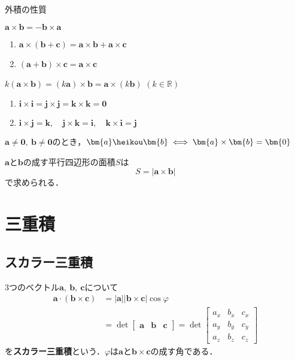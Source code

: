 \begin{kousiki}{外積の性質}
	\begin{enumerate}[label=\textbf{[\arabic*]}, labelsep=10pt, leftmargin=23pt]
		\item $\bm{a} \times \bm{b} = -\bm{b} \times \bm{a}$
		\item 
			\begin{enumerate}[label=(\roman*), labelsep=10pt, leftmargin=23pt]
				\item $\bm{a} \times (\bm{b} + \bm{c}) = \bm{a} \times \bm{b} + \bm{a} \times \bm{c}$
				\item $(\bm{a} + \bm{b}) \times \bm{c} = \bm{a} \times \bm{c}$
			\end{enumerate}
		\item $k(\bm{a} \times \bm{b}) = (k\bm{a}) \times \bm{b} = \bm{a} \times (k\bm{b})$ \qquad $(k \in \mathbb{R})$
		\item
			\begin{enumerate}[label=(\roman*), labelsep=10pt, leftmargin=23pt]
				\item $\bm{i} \times \bm{i} = \bm{j} \times \bm{j} = \bm{k} \times \bm{k} = \bm{0}$
				\item $\bm{i} \times \bm{j} = \bm{k},\quad \bm{j} \times \bm{k} = \bm{i},\quad \bm{k} \times \bm{i} = \bm{j}$
			\end{enumerate}
		\item $\bm{a} \ne \bm{0},\ \bm{b} \ne \bm{0}$のとき，$\bm{a} \heikou \bm{b} \iff \bm{a} \times \bm{b} = \bm{0}$
	\end{enumerate}
	
\end{kousiki}

$\bm{a}$と$\bm{b}$の成す平行四辺形の面積$S$は
\begin{equation}
	S = |\bm{a} \times \bm{b}|
\end{equation}
で求められる．



\section{三重積}
\subsection{スカラー三重積}

3つのベクトル$\bm{a},\ \bm{b},\ \bm{c}$について
\begin{align}
	\bm{a} \cdot (\bm{b} \times \bm{c}) &= |\bm{a}||\bm{b} \times \bm{c}|\cos\varphi \\
	&= \det
	\begin{bmatrix}
		\bm{a} & \bm{b} & \bm{c}
	\end{bmatrix}
	= \det
	\begin{bmatrix}
		a_x & b_x & c_x\\
		a_y & b_y & c_y\\
		a_z & b_z & c_z
	\end{bmatrix}
\end{align}
を\textbf{スカラー三重積}という．$\varphi$は$\bm{a}$と$\bm{b} \times \bm{c}$の成す角である．

